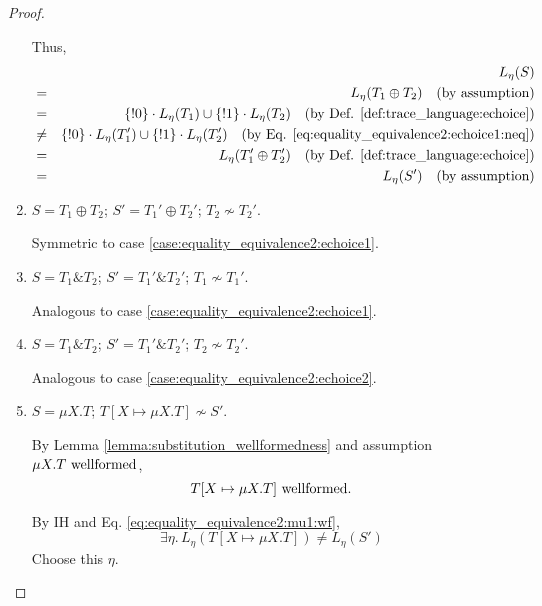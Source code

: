 \documentclass{llncs}
\newcommand*{\nsequiv}{\not\sim}
\newcommand*{\union}{\cup}
\newcommand*{\send}{\mathord{!}}
\newcommand*{\echoice}{\oplus}
\newcommand*{\ichoice}{\mathop{\&}}
\newcommand*{\concat}{\cdot}
\newcommand*{\wf}[1]{\text{$#1$ {\normalfont \rmfamily wellformed}}}
\renewcommand*{\|}{\;|\;}
\begin{document}
\begin{proof}
\begin{enumerate}
      Thus,
      \begin{eqnarray*}
        &&     L_\eta(S) \\
        &=&    L_\eta(T_1 \echoice T_2)
               \quad \text{(by assumption)} \\
        &=&    \{\send 0\} \concat L_\eta(T_1) \union \{\send 1\} \concat L_\eta(T_2)
               \quad \text{(by Def. \ref{def:trace_language:echoice})} \\
        &\neq& \{\send 0\} \concat L_\eta(T_1') \union \{\send 1\} \concat L_\eta(T_2')
               \quad \text{(by Eq. \ref{eq:equality_equivalence2:echoice1:neq})} \\
        &=&    L_\eta(T_1' \echoice T_2')
               \quad \text{(by Def. \ref{def:trace_language:echoice})} \\
        &=&    L_\eta(S')
               \quad \text{(by assumption)}
      \end{eqnarray*}

    \item
      \label{case:equality_equivalence2:echoice2}
      $S = T_1 \echoice T_2$; $S' = T_1' \echoice T_2'$; $T_2 \nsequiv T_2'$.

      Symmetric to case \ref{case:equality_equivalence2:echoice1}.

    \item
      \label{case:equality_equivalence2:ichoice1}
      $S = T_1 \ichoice T_2$; $S' = T_1' \ichoice T_2'$; $T_1 \nsequiv T_1'$.

      Analogous to case \ref{case:equality_equivalence2:echoice1}.

    \item
      \label{case:equality_equivalence2:ichoice2}
      $S = T_1 \ichoice T_2$; $S' = T_1' \ichoice T_2'$; $T_2 \nsequiv T_2'$.

      Analogous to case \ref{case:equality_equivalence2:echoice2}.

    \item
      \label{case:equality_equivalence2:mu1}
      $S = \mu X.T$; $T[X \mapsto \mu X.T] \nsequiv S'$.

      By Lemma \ref{lemma:substitution_wellformedness} and assumption
      $\wf{\mu X.T}$,
      \begin{equation}
        \label{eq:equality_equivalence2:mu1:wf}
        \wf{T[X \mapsto \mu X.T]}.
      \end{equation}

      By IH and Eq. \ref{eq:equality_equivalence2:mu1:wf},
      \begin{equation}
        \label{eq:equality_equivalence2:mu1:neq}
        \exists \eta.\, L_\eta(T[X \mapsto \mu X.T]) \neq L_\eta(S')
      \end{equation}
      Choose this $\eta$.


\end{enumerate}
\end{proof}
\end{document}
